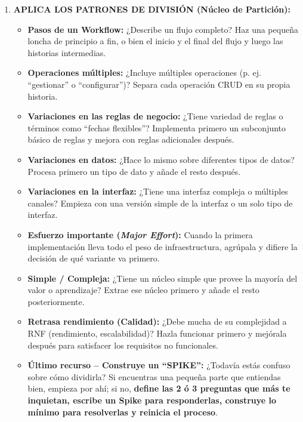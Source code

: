 \begin{enumerate}[label=\textbf{Fase \arabic*:}, leftmargin=1.9cm, itemsep=5pt]
    \item \textbf{APLICA LOS PATRONES DE DIVISIÓN (Núcleo de Partición):}
    \begin{itemize}[itemsep=2pt]
        \item \textbf{Pasos de un Workflow:} ¿Describe un flujo completo? Haz una pequeña loncha de principio a fin, o bien el inicio y el final del flujo y luego las historias intermedias.
        \item \textbf{Operaciones múltiples:} ¿Incluye múltiples operaciones (p. ej. ``gestionar'' o ``configurar'')? Separa cada operación CRUD en su propia historia.
        \item \textbf{Variaciones en las reglas de negocio:} ¿Tiene variedad de reglas o términos como ``fechas flexibles''? Implementa primero un subconjunto básico de reglas y mejora con reglas adicionales después.
        \item \textbf{Variaciones en datos:} ¿Hace lo mismo sobre diferentes tipos de datos? Procesa primero un tipo de dato y añade el resto después.
        \item \textbf{Variaciones en la interfaz:} ¿Tiene una interfaz compleja o múltiples canales? Empieza con una versión simple de la interfaz o un solo tipo de interfaz.
        \item \textbf{Esfuerzo importante (\textit{Major Effort}):} Cuando la primera implementación lleva todo el peso de infraestructura, agrúpala y difiere la decisión de qué variante va primero.
        \item \textbf{Simple / Compleja:} ¿Tiene un núcleo simple que provee la mayoría del valor o aprendizaje? Extrae ese núcleo primero y añade el resto posteriormente.
        \item \textbf{Retrasa rendimiento (Calidad):} ¿Debe mucha de su complejidad a RNF (rendimiento, escalabilidad)? Hazla funcionar primero y mejórala después para satisfacer los requisitos no funcionales.
        \item \textbf{Último recurso -- Construye un ``SPIKE'':} ¿Todavía estás confuso sobre cómo dividirla? Si encuentras una pequeña parte que entiendas bien, empieza por ahí; si no, \textbf{define las 2 ó 3 preguntas que más te inquietan, escribe un Spike para responderlas, construye lo mínimo para resolverlas y reinicia el proceso}.
    \end{itemize}


\end{enumerate}
